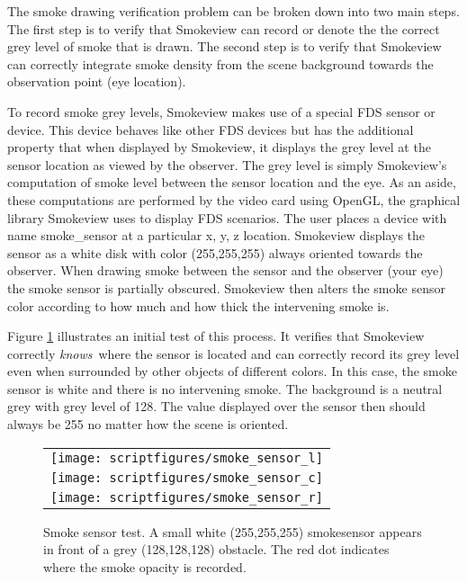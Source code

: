 \documentclass[11pt,twoside]{book}
\newcommand{\figoptions}{hbp}
\begin{document}
The smoke drawing verification problem can be broken down into two main steps.  The first step is to verify that Smokeview can record or denote the the correct grey level of smoke that is drawn.
The second step is to verify that Smokeview can correctly integrate smoke density from the scene background towards the observation point (eye location).

To record smoke grey levels, Smokeview makes use of a special FDS sensor or device.
This device behaves like other FDS devices but has the additional property that when displayed by Smokeview, it displays the grey level at the sensor location as viewed by the observer.  The grey level is simply Smokeview's computation of smoke level between the sensor location and the eye.  As an aside, these computations are performed by the video card using OpenGL, the graphical library Smokeview uses to display FDS scenarios.  The user places a device with name smoke\_sensor at a particular x, y, z location.
Smokeview displays the sensor as a white disk with color (255,255,255) always oriented towards the observer. When drawing smoke between the sensor and the observer (your eye) the smoke sensor is partially obscured.  Smokeview then alters the smoke sensor color according to how much and how thick the intervening smoke is.

Figure \ref{figsmokesensor} illustrates an initial test of this process.  It verifies that Smokeview correctly {\em knows}\ where the sensor is located and can correctly record its grey level even when surrounded by other objects of different colors.  In this case, the smoke sensor is white and there is no intervening smoke.  The background is a neutral grey with grey level of 128.  The value displayed over the sensor then should always be 255 no matter how the scene is oriented.
\begin{figure}[\figoptions]
\begin{center}
 \centering
\begin{tabular}{c}
\texttt{[image: scriptfigures/smoke\_sensor\_l]}\\
\texttt{[image: scriptfigures/smoke\_sensor\_c]}\\
\texttt{[image: scriptfigures/smoke\_sensor\_r]}\\

 \end{tabular}
\end{center}
\caption[Smoke sensor test.]{Smoke sensor test.
A small white (255,255,255) smokesensor appears in front of a grey (128,128,128) obstacle.
The red dot indicates where the smoke opacity is recorded.
}
\label{figsmokesensor}%
\end{figure}
\end{document}
